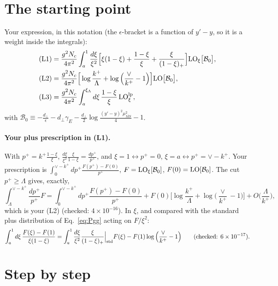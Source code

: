 \documentclass[10pt]{article}
\numberwithin{equation}{section}
\newcommand{\MSb}{\overline{MS}}
\newcommand{\LO}{{\rm LO}}
\begin{document}
\section{The starting point}
Your expression, in this notation (the $\epsilon$-bracket is a function of $y'-y$, so it is a weight inside the integrals):
\begin{align}
\text{(L1)}&=\frac{g^2N_c}{4\pi^2}\int_a^1\frac{d\xi}{\xi^2}\Big[\xi(1-\xi)+\frac{1-\xi}{\xi}+\frac{\xi}{(1-\xi)_+}\Big]\LO_\xi\big[\mathcal B_0\big],\notag\\
\text{(L2)}&=\frac{g^2N_c}{4\pi^2}\Big[\log\frac{k^+}{\Lambda}+\log\Big(\frac{\vee}{k^+}-1\Big)\Big]\LO\big[\mathcal B_0\big],\notag\\
\text{(L3)}&=\frac{g^2N_c}{4\pi^2}\int_a^{\xi_\Lambda}d\xi\,\frac{1-\xi}{\xi}\,\LO^{\rm lp}_\xi,\label{eq:start}
\end{align}
with $\mathcal B_0\equiv-\frac{d_\perp}{\epsilon}-d_\perp\gamma_E-\frac{d_\perp}{2}\log\frac{(y'-y)^2\mu^2_{\MSb}}{4}-1$.

\paragraph{Your plus prescription in (L1).}\label{sec:plus} With $p^+=k^+\frac{1-\xi}{\xi}$, $\frac{d\xi}{\xi^2}\frac{\xi}{1-\xi}=\frac{dp^+}{p^+}$, and $\xi=1\leftrightarrow p^+=0$, $\xi=a\leftrightarrow p^+=\vee-k^+$. Your prescription is $\int_0^{\vee-k^+}dp^+\frac{F(p^+)-F(0)}{p^+}$, $F=\LO_\xi[\mathcal B_0]$, $F(0)=\LO[\mathcal B_0]$. The cut $p^+\ge\Lambda$ gives, exactly,
\begin{equation}
\int_\Lambda^{\vee-k^+}\frac{dp^+}{p^+}F=\int_0^{\vee-k^+}dp^+\frac{F(p^+)-F(0)}{p^+}+F(0)\Big[\log\frac{k^+}{\Lambda}+\log\Big(\frac{\vee}{k^+}-1\Big)\Big]+O\Big(\frac{\Lambda}{k^+}\Big),
\end{equation}
which is your (L2) (checked: $4\times10^{-16}$). In $\xi$, and compared with the standard plus distribution of Eq.~\eqref{eq:Pgg} acting on $F/\xi^2$:
\begin{equation}
\int_a^1d\xi\,\frac{F(\xi)-F(1)}{\xi(1-\xi)}=\int_a^1\frac{d\xi}{\xi^2}\frac{\xi}{(1-\xi)_+}\Big|_{\rm std}F(\xi)-F(1)\log\Big(\frac{\vee}{k^+}-1\Big)\qquad(\text{checked: }6\times10^{-17}).\label{eq:pstd}
\end{equation}

\section{Step by step}
\end{document}
